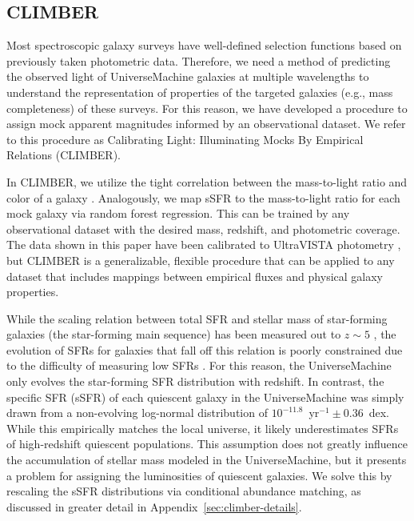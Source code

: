 \documentclass[twocolumn,twocolappendix]{aastex63}
\begin{document}
\subsection{CLIMBER}
\label{sec:climber}

Most spectroscopic galaxy surveys have well-defined selection functions based on previously taken photometric data. Therefore, we need a method of predicting the observed light of UniverseMachine galaxies at multiple wavelengths to understand the representation of properties of the targeted galaxies (e.g., mass completeness) of these surveys. For this reason, we have developed a procedure to assign mock apparent magnitudes informed by an observational dataset. We refer to this procedure as Calibrating Light: Illuminating Mocks By Empirical Relations (CLIMBER).

In CLIMBER, we utilize the tight correlation between the mass-to-light ratio and color of a galaxy \citep[e.g.,][]{Bell:deJong:2001}. Analogously, we map sSFR to the mass-to-light ratio for each mock galaxy via random forest regression. This can be trained by any observational dataset with the desired mass, redshift, and photometric coverage. The data shown in this paper have been calibrated to UltraVISTA photometry \citep{Muzzin:2013}, but CLIMBER is a generalizable, flexible procedure that can be applied to any dataset that includes mappings between empirical fluxes and physical galaxy properties.

While the scaling relation between total SFR and stellar mass of star-forming galaxies (the star-forming main sequence) has been measured out to $z \sim 5$ \citep{Kajisawa:2010, Whitaker:2014, Tomczak:2016, Leslie:2020}, the evolution of SFRs for galaxies that fall off this relation is poorly constrained due to the difficulty of measuring low SFRs \citep{Leja:2019}. For this reason, the UniverseMachine only evolves the star-forming SFR distribution with redshift. In contrast, the specific SFR (sSFR) of each quiescent galaxy in the UniverseMachine was simply drawn from a non-evolving log-normal distribution of $10^{-11.8}$~yr$^{-1} \pm 0.36$~dex. While this empirically matches the local universe, it likely underestimates SFRs of high-redshift quiescent populations. This assumption does not greatly influence the accumulation of stellar mass modeled in the UniverseMachine, but it presents a problem for assigning the luminosities of quiescent galaxies. We solve this by rescaling the sSFR distributions via conditional abundance matching, as discussed in greater detail in Appendix~\ref{sec:climber-details}.
\end{document}

